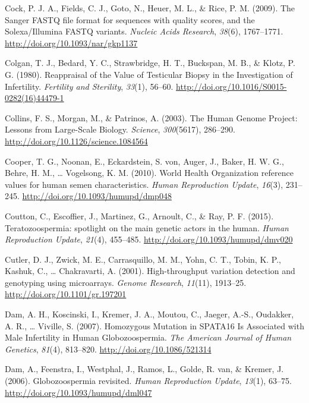\documentclass[12pt,twoside]{reedthesis}
\theoremstyle{definition}
\theoremstyle{definition}
\theoremstyle{remark}
\begin{document}
  \hypertarget{ref-Cock2009}{}
  Cock, P. J. A., Fields, C. J., Goto, N., Heuer, M. L., \& Rice, P. M.
  (2009). The Sanger FASTQ file format for sequences with quality scores,
  and the Solexa/Illumina FASTQ variants. \emph{Nucleic Acids Research},
  \emph{38}(6), 1767--1771. \url{http://doi.org/10.1093/nar/gkp1137}
  
  \hypertarget{ref-Colgan1980}{}
  Colgan, T. J., Bedard, Y. C., Strawbridge, H. T., Buckspan, M. B., \&
  Klotz, P. G. (1980). Reappraisal of the Value of Testicular Biopsy in
  the Investigation of Infertility. \emph{Fertility and Sterility},
  \emph{33}(1), 56--60. \url{http://doi.org/10.1016/S0015-0282(16)44479-1}
  
  \hypertarget{ref-Collins2003}{}
  Collins, F. S., Morgan, M., \& Patrinos, A. (2003). The Human Genome
  Project: Lessons from Large-Scale Biology. \emph{Science},
  \emph{300}(5617), 286--290. \url{http://doi.org/10.1126/science.1084564}
  
  \hypertarget{ref-Cooper2010}{}
  Cooper, T. G., Noonan, E., Eckardstein, S. von, Auger, J., Baker, H. W.
  G., Behre, H. M., \ldots{} Vogelsong, K. M. (2010). World Health
  Organization reference values for human semen characteristics.
  \emph{Human Reproduction Update}, \emph{16}(3), 231--245.
  \url{http://doi.org/10.1093/humupd/dmp048}
  
  \hypertarget{ref-Coutton2015}{}
  Coutton, C., Escoffier, J., Martinez, G., Arnoult, C., \& Ray, P. F.
  (2015). Teratozoospermia: spotlight on the main genetic actors in the
  human. \emph{Human Reproduction Update}, \emph{21}(4), 455--485.
  \url{http://doi.org/10.1093/humupd/dmv020}
  
  \hypertarget{ref-Cutler2001}{}
  Cutler, D. J., Zwick, M. E., Carrasquillo, M. M., Yohn, C. T., Tobin, K.
  P., Kashuk, C., \ldots{} Chakravarti, A. (2001). High-throughput
  variation detection and genotyping using microarrays. \emph{Genome
  Research}, \emph{11}(11), 1913--25.
  \url{http://doi.org/10.1101/gr.197201}
  
  \hypertarget{ref-Dam2007a}{}
  Dam, A. H., Koscinski, I., Kremer, J. A., Moutou, C., Jaeger, A.-S.,
  Oudakker, A. R., \ldots{} Viville, S. (2007). Homozygous Mutation in
  SPATA16 Is Associated with Male Infertility in Human Globozoospermia.
  \emph{The American Journal of Human Genetics}, \emph{81}(4), 813--820.
  \url{http://doi.org/10.1086/521314}
  
  \hypertarget{ref-Dam2006}{}
  Dam, A., Feenstra, I., Westphal, J., Ramos, L., Golde, R. van, \&
  Kremer, J. (2006). Globozoospermia revisited. \emph{Human Reproduction
  Update}, \emph{13}(1), 63--75.
  \url{http://doi.org/10.1093/humupd/dml047}
  
\end{document}
